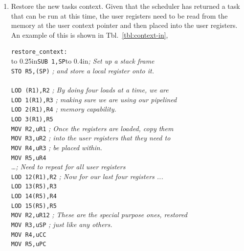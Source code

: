 \documentclass{gqtekspec}
\begin{document}
\begin{enumerate}

\item Restore the new tasks context.  Given that the scheduler has returned a
	task that can be run at this time, the user registers need to be
	read from the memory at the user context pointer and then placed into
	the user registers.  An example of this is shown in
	Tbl.~\ref{tbl:context-in},
\begin{table}\begin{center}
\begin{tabbing}
{\tt restore\_context:} \\
\hbox to 0.25in{}\= {\tt SUB 1,SP}\hbox to 0.4in{}\={\em ; Set up a stack frame} \\
\>	{\tt STO R5,(SP)} \> {\em ; and store a local register onto it.}\\
\\
\>	{\tt LOD (R1),R2} \> {\em ; By doing four loads at a time, we are }\\
\>	{\tt LOD 1(R1),R3} \> {\em ; making sure we are using our pipelined}\\
\>	{\tt LOD 2(R1),R4} \> {\em ; memory capability. }\\
\>	{\tt LOD 3(R1),R5} \\
\>	{\tt MOV R2,uR1} \> {\em ; Once the registers are loaded, copy them }\\
\>	{\tt MOV R3,uR2} \> {\em ; into the user registers that they need to}\\
\>	{\tt MOV R4,uR3} \> {\em ; be placed within.} \\
\>	{\tt MOV R5,uR4} \\
	\> \ldots {\em ; Need to repeat for all user registers} \\
\>	{\tt LOD 12(R1),R2} \> {\em ; Now for our last four registers ...}\\
\>	{\tt LOD 13(R5),R3} \\
\>	{\tt LOD 14(R5),R4} \\
\>	{\tt LOD 15(R5),R5} \\
\>	{\tt MOV R2,uR12} \> {\em ; These are the special purpose ones, restored }\\
\>	{\tt MOV R3,uSP} \> {\em ; just like any others.}\\
\>	{\tt MOV R4,uCC} \\
\>	{\tt MOV R5,uPC} \\


\end{tabbing}
\end{center}
\end{table}
\end{enumerate}
\end{document}
